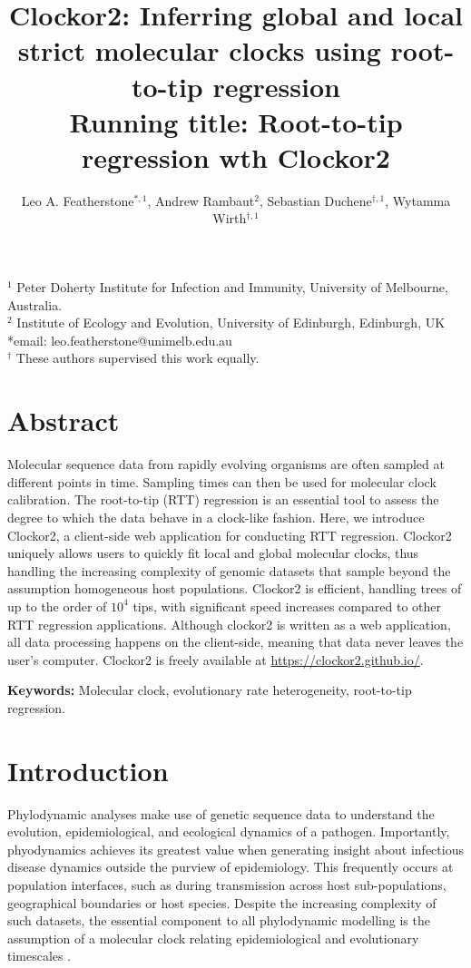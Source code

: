 \documentclass{article}
\title{Clockor2:  Inferring global and local strict molecular clocks using root-to-tip regression \\ \large Running title: Root-to-tip regression wth Clockor2}
\author{Leo A. Featherstone$^{\ast,1}$, Andrew Rambaut$^{2}$, Sebastian Duchene$^{\dagger,1}$, Wytamma Wirth$^{\dagger,1}$\\}
\date{}
\begin{document}
\maketitle

$^{1}$ Peter Doherty Institute for Infection and Immunity, University of Melbourne, Australia.\\
$^{2}$ Institute of Ecology and Evolution, University of Edinburgh, Edinburgh, UK\\
*email: leo.featherstone@unimelb.edu.au\\
$^{\dagger}$ These authors supervised this work equally.

\linenumbers
\section*{Abstract}
Molecular sequence data from rapidly evolving organisms are often sampled at different points in time. Sampling times can then be used for molecular clock calibration. The root-to-tip (RTT) regression is an essential tool to assess the degree to which the data behave in a clock-like fashion. Here, we introduce Clockor2, a client-side web application for conducting RTT regression. Clockor2 uniquely allows users to quickly fit local and global molecular clocks, thus handling the increasing complexity of genomic datasets that sample beyond the assumption homogeneous host populations. Clockor2 is efficient, handling trees of up to the order of $10^4$ tips, with significant speed increases compared to other RTT regression applications. Although clockor2 is written as a web application, all data processing happens on the client-side, meaning that data never leaves the user's computer. Clockor2 is freely available at \url{https://clockor2.github.io/}.

\textbf{Keywords:} Molecular clock, evolutionary rate heterogeneity, root-to-tip regression.

\section*{Introduction}
Phylodynamic analyses make use of genetic sequence data to understand the evolution, epidemiological, and ecological dynamics of a pathogen. Importantly, phyodynamics achieves its greatest value when generating insight about infectious disease dynamics outside the purview of epidemiology. This frequently occurs at population interfaces, such as during transmission across host sub-populations,  geographical boundaries or host species. Despite the increasing complexity of such datasets, the essential component to all phylodynamic modelling is the assumption of a molecular clock relating epidemiological and evolutionary timescales \citep{biek_measurably_2015}.
\end{document}
